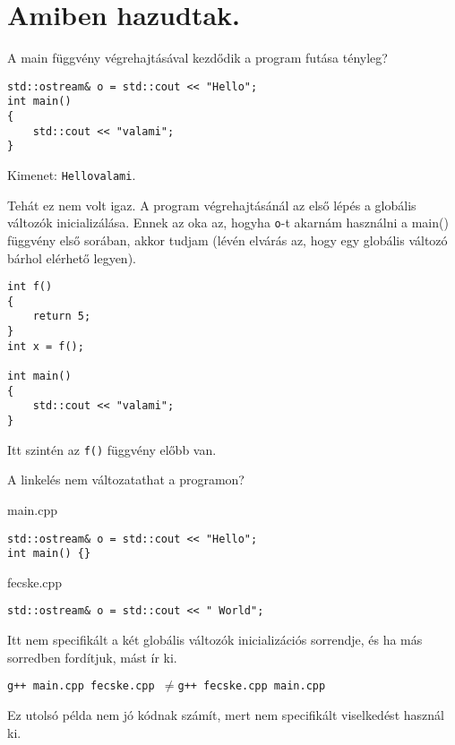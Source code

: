 \documentclass[a4paper,11.5pt]{article}
\begin{document}
	\section{Amiben hazudtak.}
	\begin{example}
		A main függvény végrehajtásával kezdődik a program futása tényleg?
		\begin{lstlisting}
std::ostream& o = std::cout << "Hello";
int main()
{
	std::cout << "valami";
}
		\end{lstlisting}
		Kimenet: \texttt{Hellovalami}.
		
		Tehát ez nem volt igaz. A program végrehajtásánál az első lépés a globális változók inicializálása. Ennek az oka az, hogyha \texttt{o}-t akarnám használni a main() függvény első sorában, akkor tudjam (lévén elvárás az, hogy egy globális változó bárhol elérhető legyen).
		\begin{lstlisting}
int f()
{
	return 5;
}
int x = f();

int main()
{
	std::cout << "valami";
}
		\end{lstlisting}
		Itt szintén az \texttt{f()} függvény előbb van.
	\end{example}
	\begin{example}
		A linkelés nem változatathat a programon?
		
		main.cpp
		\begin{lstlisting}
std::ostream& o = std::cout << "Hello";
int main() {}
		\end{lstlisting}
		fecske.cpp
		\begin{lstlisting}
std::ostream& o = std::cout << " World";
		\end{lstlisting}
		Itt nem specifikált a két globális változók inicializációs sorrendje, és ha más sorredben fordítjuk, mást ír ki.
		
		{\centering \texttt{g++ main.cpp fecske.cpp \quad $\not=$\quad g++ fecske.cpp main.cpp} \par}
	\end{example}
	\begin{note}
		Ez utolsó példa nem jó kódnak számít, mert nem specifikált viselkedést használ ki.
	\end{note}
\end{document}
